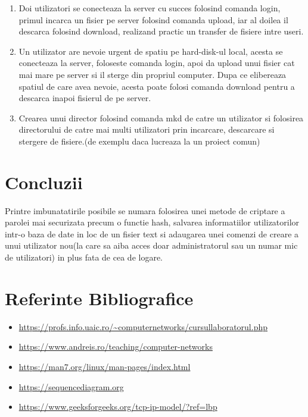 \documentclass[runningheads]{llncs}
\begin{document}
\begin{enumerate}
    \item Doi utilizatori se conecteaza la server cu succes folosind comanda login, primul incarca un fisier pe server folosind comanda upload, iar al doilea il descarca folosind download, realizand practic un transfer de fisiere intre useri. 
    
    \item Un utilizator are nevoie urgent de spatiu pe hard-disk-ul local, acesta se conecteaza la server, foloseste comanda login, apoi da upload unui fisier cat mai mare pe server si il sterge din propriul computer. Dupa ce elibereaza spatiul de care avea nevoie, acesta poate folosi comanda download pentru a descarca inapoi fisierul de pe server.

    \item Crearea unui director folosind comanda mkd de catre un utilizator si folosirea directorului de catre mai multi utilizatori prin incarcare, descarcare si stergere de fisiere.(de exemplu daca lucreaza la un proiect comun)
    
\end{enumerate}

\section{Concluzii}
Printre imbunatatirile posibile se numara folosirea unei metode de criptare a parolei mai securizata precum o functie hash, salvarea informatiilor utilizatorilor intr-o baza de date in loc de un fisier text si adaugarea unei comenzi de creare a unui utilizator nou(la care sa aiba acces doar administratorul sau un numar mic de utilizatori) in plus fata de cea de logare.  

\section{Referinte Bibliografice}

\begin{itemize}

    \item \url{https://profs.info.uaic.ro/~computernetworks/cursullaboratorul.php} 
    \item \url{https://www.andreis.ro/teaching/computer-networks}
    \item \url{https://man7.org/linux/man-pages/index.html}
    \item \url{https://sequencediagram.org}  
    \item \url{https://www.geeksforgeeks.org/tcp-ip-model/?ref=lbp}
    
\end{itemize}
\end{document}
